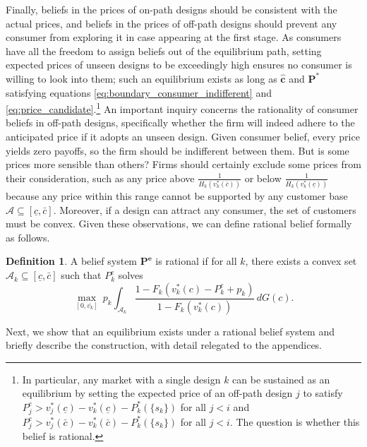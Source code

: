 \documentclass[14pt]{article}
\theoremstyle{plain}
\theoremstyle{definition}
\newtheorem{defn}{Definition}[section]
\theoremstyle{remark}
\DeclareRobustCommand\1{\futurelet\oneNext\oneCheck}
\begin{document}
Finally, beliefs in the prices of on-path designs should be consistent with the actual prices, and beliefs in the prices of off-path designs should prevent any consumer from exploring it in case appearing at the first stage. As consumers have all the freedom to assign beliefs out of the equilibrium path, setting expected prices of unseen designs to be exceedingly high ensures no consumer is willing to look into them; such an equilibrium exists as long as $\mathbf{\hat{c}}$ and $\mathbf{P^*}$ satisfying equations \eqref{eq:boundary_consumer_indifferent} and \eqref{eq:price_candidate}.\footnote{In particular, any market with a single design $k$ can be sustained as an equilibrium by setting the expected price of an off-path design $j$ to satisfy $P_j^e> v_j^*(\underline{c})-v_k^*(\underline{c})-P_k^*(\{s_k\})$ for all $j<i$ and $P_j^e> v_j^*(\bar{c})-v_k^*(\bar{c})-P_k^*(\{s_k\})$ for all $j<i$. The question is whether this belief is rational.} An important inquiry concerns the rationality of consumer beliefs in off-path designs, specifically whether the firm will indeed adhere to the anticipated price if it adopts an unseen design. Given consumer belief, every price yields zero payoffs, so the firm should be indifferent between them. But is some prices more sensible than others? Firms should certainly exclude some prices from their consideration, such as any price above $\frac{1}{H_k(v_k^*(\bar{c}))}$ or below $\frac{1}{H_k(v_k^*(\underline{c}))}$ because any price within this range cannot be supported by any customer base $\mathcal{A} \subseteq [\underline{c}, \bar{c}]$. Moreover, if a design can attract any consumer, the set of customers must be convex. Given these observations, we can define rational belief formally as follows.
\begin{defn}
A belief system $\mathbf{P^e}$ is rational if for all $k$, there exists a convex set $\mathcal{A}_k\subseteq [\underline{c}, \bar{c}]$ such that $P^e_k$ solves 
\[\max_{[0, \bar{v_k}]} \: p_k\int_{\mathcal{A}_k} \frac{1-F_k(v_k^*(c)-P_k^e+p_k)}{1-F_k(v_k^*(c))}\,dG(c).\]
\end{defn}
Next, we show that an equilibrium exists under a rational belief system and briefly describe the construction, with detail relegated to the appendices. 
\end{document}
